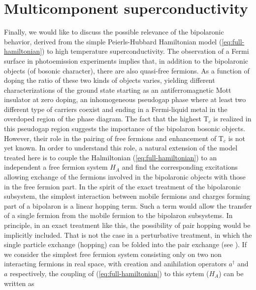\section{Multicomponent superconductivity}

Finally, we would like to discuss the possible relevance of the bipolaronic behavior, derived from the simple Peierls-Hubbard Hamiltonian model (\ref{eq:full-hamiltonian}) to high temperature superconductivity. 
The observation of a Fermi surface in photoemission experiments \cite{Ding1996,Hussey2003} implies that, in addition to the bipolaronic objects (of bosonic character), there are also quasi-free fermions. 
As a function of doping the ratio of these two kinds of objects varies, yielding different characterizations of the ground state starting as an antiferromagnetic Mott insulator at zero doping, an inhomogeneous pseudogap phase where at least two different type of carriers coexist and ending in a Fermi-liquid metal in the overdoped region of the phase diagram. 
The fact that the highest T$_c$  is realized in this pseudogap region suggests the importance of the bipolaron bosonic objects. 
However, their role in the pairing of free fermions and enhancement of T$_c$ is not yet known. 
In order to understand this role, a natural extension of the model treated here is to couple the Halmiltonian  (\ref{eq:full-hamiltonian}) to an independent a free fermion system $H_A$ and find the corresponding excitations allowing exchange of the fermions involved in the bipolaronic objects with those in the free fermion part. 
In the spirit of the exact treatment of the bipolaronic subsystem, the simplest interaction between mobile fermions and charges forming part of a bipolaron is a linear hopping term. 
Such a term would allow the transfer of a single fermion from the mobile fermion to the bipolaron subsystems. 
In principle, in an exact treatment like this, the possibility of pair hopping would be implicitly included. 
That is not the case in a perturbative treatment, in which the single particle exchange (hopping) can be folded into the pair exchange (see \cite{Bar-Yam1991}).
If we consider the simplest free fermion system consisting only on two non interacting fermions in real space, with creation and anihilation operators $a^\dagger$ and $a$ respectively, the coupling of (\ref{eq:full-hamiltonian}) to this sytem ($H_A$) can be written as

